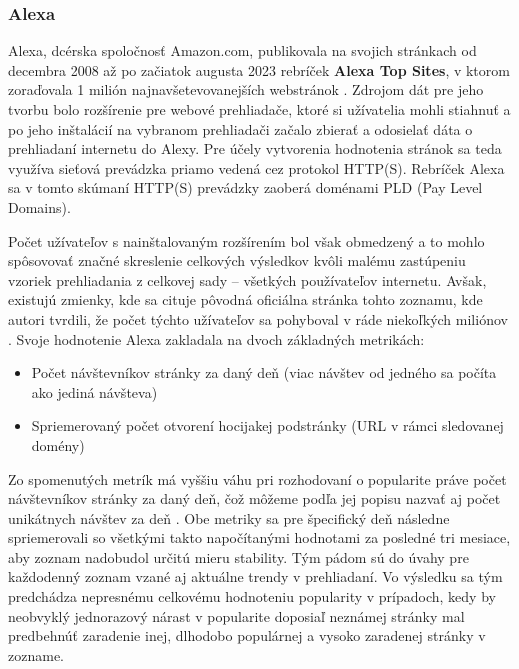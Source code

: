 \subsubsection{Alexa}

Alexa, dcérska spoločnosť Amazon.com, publikovala na svojich stránkach od decembra 2008 až po začiatok augusta 2023 rebríček \textbf{Alexa Top Sites}, v ktorom zoraďovala 1 milión 
najnavšetevovanejších webstránok \cite{tranco-methodology}.
Zdrojom dát pre jeho tvorbu bolo rozšírenie pre webové prehliadače, ktoré si užívatelia mohli stiahnuť a po jeho inštalácií na vybranom prehliadači začalo zbierať a odosielať
dáta o prehliadaní internetu do Alexy. 
Pre účely vytvorenia hodnotenia stránok sa teda využíva sieťová prevádzka priamo vedená cez protokol HTTP(S). 
Rebríček Alexa sa v tomto skúmaní HTTP(S) prevádzky zaoberá doménami PLD (Pay Level Domains). 

Počet užívateľov s nainštalovaným rozšírením bol však obmedzený 
a to mohlo spôsovovať značné skreslenie celkových výsledkov kvôli malému zastúpeniu vzoriek prehliadania z celkovej sady -- všetkých používateľov internetu. 
Avšak, existujú zmienky, kde sa cituje pôvodná oficiálna stránka tohto zoznamu, kde autori tvrdili, že počet týchto užívateľov sa pohyboval v ráde niekoľkých miliónov \cite{tranco}.
Svoje hodnotenie Alexa zakladala na dvoch základných metrikách: \cite{kinsta-alexa-rank-article}\cite{tranco}
\begin{itemize}
    \item Počet návštevníkov stránky za daný deň (viac návštev od jedného sa počíta ako jediná návšteva)
    \item Spriemerovaný počet otvorení hocijakej podstránky (URL v rámci sledovanej domény)
\end{itemize}

Zo spomenutých metrík má vyššiu váhu pri rozhodovaní o popularite práve počet návštevníkov stránky za daný deň, čož môžeme podľa jej popisu nazvať aj počet unikátnych návštev za deň \cite{tranco}.
Obe metriky sa pre špecifický deň následne spriemerovali so všetkými takto napočítanými hodnotami za posledné tri mesiace, aby zoznam nadobudol určitú mieru stability. 
Tým pádom sú do úvahy pre každodenný zoznam vzané aj aktuálne trendy v prehliadaní. Vo výsledku sa tým predchádza nepresnému celkovému hodnoteniu popularity v prípadoch, 
kedy by neobvyklý jednorazový nárast v popularite doposiaľ neznámej stránky mal predbehnúť zaradenie inej, dlhodobo populárnej a vysoko zaradenej stránky v zozname. 

